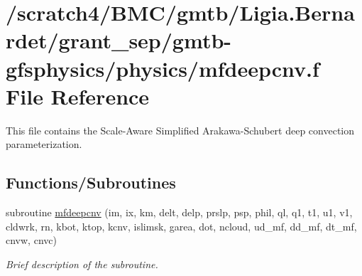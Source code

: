 \hypertarget{mfdeepcnv_8f}{}\section{/scratch4/\+B\+M\+C/gmtb/\+Ligia.Bernardet/grant\+\_\+sep/gmtb-\/gfsphysics/physics/mfdeepcnv.f File Reference}
\label{mfdeepcnv_8f}


This file contains the Scale-\/\+Aware Simplified Arakawa-\/\+Schubert deep convection parameterization.  


\subsection*{Functions/\+Subroutines}
{\bf }\par
\begin{DoxyCompactItemize}
\item 
subroutine \hyperlink{group___s_a_s_a_s_ga7e42b11a1cdf800213df4c0d35552f75}{mfdeepcnv} (im, ix, km, delt, delp, prslp, psp, phil, ql,                                           q1, t1, u1, v1, cldwrk, rn, kbot, ktop, kcnv, islimsk, garea,                                                   dot, ncloud, ud\+\_\+mf, dd\+\_\+mf, dt\+\_\+mf, cnvw, cnvc)
\begin{DoxyCompactList}\small\item\em Brief description of the subroutine. \end{DoxyCompactList}\end{DoxyCompactItemize}

